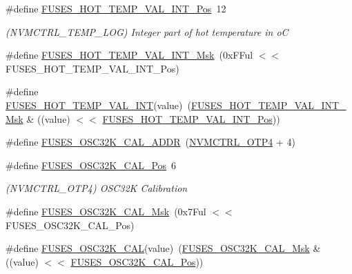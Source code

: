 \begin{DoxyCompactItemize}
\#define \mbox{\hyperlink{group__fuses__api_ga3c7e8d3e46d03e0b6424b34762295643}{F\+U\+S\+E\+S\+\_\+\+H\+O\+T\+\_\+\+T\+E\+M\+P\+\_\+\+V\+A\+L\+\_\+\+I\+N\+T\+\_\+\+Pos}}~12
\begin{DoxyCompactList}\small\item\em (N\+V\+M\+C\+T\+R\+L\+\_\+\+T\+E\+M\+P\+\_\+\+L\+OG) Integer part of hot temperature in oC \end{DoxyCompactList}\item 
\#define \mbox{\hyperlink{group__fuses__api_gaff5f713bd806967ce109e596af3db8c9}{F\+U\+S\+E\+S\+\_\+\+H\+O\+T\+\_\+\+T\+E\+M\+P\+\_\+\+V\+A\+L\+\_\+\+I\+N\+T\+\_\+\+Msk}}~(0x\+F\+Ful $<$$<$ F\+U\+S\+E\+S\+\_\+\+H\+O\+T\+\_\+\+T\+E\+M\+P\+\_\+\+V\+A\+L\+\_\+\+I\+N\+T\+\_\+\+Pos)
\item 
\#define \mbox{\hyperlink{group__fuses__api_gab8c34e55e4455db7b5c6bf0d6a0fddff}{F\+U\+S\+E\+S\+\_\+\+H\+O\+T\+\_\+\+T\+E\+M\+P\+\_\+\+V\+A\+L\+\_\+\+I\+NT}}(value)~(\mbox{\hyperlink{group__fuses__api_gaff5f713bd806967ce109e596af3db8c9}{F\+U\+S\+E\+S\+\_\+\+H\+O\+T\+\_\+\+T\+E\+M\+P\+\_\+\+V\+A\+L\+\_\+\+I\+N\+T\+\_\+\+Msk}} \& ((value) $<$$<$ \mbox{\hyperlink{group__fuses__api_ga3c7e8d3e46d03e0b6424b34762295643}{F\+U\+S\+E\+S\+\_\+\+H\+O\+T\+\_\+\+T\+E\+M\+P\+\_\+\+V\+A\+L\+\_\+\+I\+N\+T\+\_\+\+Pos}}))
\item 
\#define \mbox{\hyperlink{group__fuses__api_gad45b9b2000735151828419706b9c4b8c}{F\+U\+S\+E\+S\+\_\+\+O\+S\+C32\+K\+\_\+\+C\+A\+L\+\_\+\+A\+D\+DR}}~(\mbox{\hyperlink{group___s_a_m_d21_j18_a__base_ga138b4aca5a0446a745fe143c1dca8165}{N\+V\+M\+C\+T\+R\+L\+\_\+\+O\+T\+P4}} + 4)
\item 
\#define \mbox{\hyperlink{group__fuses__api_ga58c9e0b089faa8e9b4673ae07c6d9c7e}{F\+U\+S\+E\+S\+\_\+\+O\+S\+C32\+K\+\_\+\+C\+A\+L\+\_\+\+Pos}}~6
\begin{DoxyCompactList}\small\item\em (N\+V\+M\+C\+T\+R\+L\+\_\+\+O\+T\+P4) O\+S\+C32K Calibration \end{DoxyCompactList}\item 
\#define \mbox{\hyperlink{group__fuses__api_gaa519aae35b048c928de47aa4a16eab7b}{F\+U\+S\+E\+S\+\_\+\+O\+S\+C32\+K\+\_\+\+C\+A\+L\+\_\+\+Msk}}~(0x7\+Ful $<$$<$ F\+U\+S\+E\+S\+\_\+\+O\+S\+C32\+K\+\_\+\+C\+A\+L\+\_\+\+Pos)
\item 
\#define \mbox{\hyperlink{group__fuses__api_ga17b4d89d3311f4be665234c7c0283a3e}{F\+U\+S\+E\+S\+\_\+\+O\+S\+C32\+K\+\_\+\+C\+AL}}(value)~(\mbox{\hyperlink{group__fuses__api_gaa519aae35b048c928de47aa4a16eab7b}{F\+U\+S\+E\+S\+\_\+\+O\+S\+C32\+K\+\_\+\+C\+A\+L\+\_\+\+Msk}} \& ((value) $<$$<$ \mbox{\hyperlink{group__fuses__api_ga58c9e0b089faa8e9b4673ae07c6d9c7e}{F\+U\+S\+E\+S\+\_\+\+O\+S\+C32\+K\+\_\+\+C\+A\+L\+\_\+\+Pos}}))

\end{DoxyCompactItemize}
